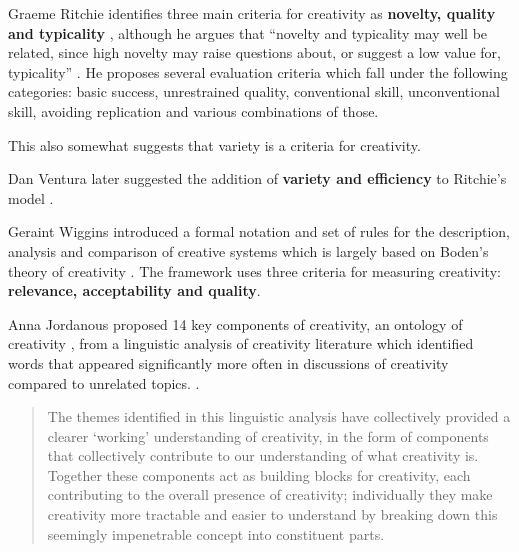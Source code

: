Graeme Ritchie identifies three main criteria for creativity as \textbf{novelty, quality and typicality} \citeyear[p.72-73]{Ritchie2007}, although he argues that ``novelty and typicality may well be related, since high novelty may raise questions about, or suggest a low value for, typicality'' \citeyear[p.73]{Ritchie2007} \citeyear[see also][]{Ritchie2001}. He proposes several evaluation criteria which fall under the following categories: \parencite[p.91-92]{Ritchie2007} basic success, unrestrained quality, conventional skill, unconventional skill, avoiding replication and various combinations of those.

\begin{fcom}
  This also somewhat suggests that variety is a criteria for creativity.
\end{fcom}

Dan Ventura later suggested the addition of \textbf{variety and efficiency} to Ritchie’s model \citeyear[p.7]{Ventura2008}.

Geraint Wiggins introduced a formal notation and set of rules for the description, analysis and comparison of creative systems \citeyear{Wiggins2006} which is largely  based on Boden’s theory of creativity \citeyear{Boden2003}. The framework uses three criteria for measuring creativity: \textbf{relevance, acceptability and quality}.

Anna Jordanous proposed 14 key components of creativity, an ontology of creativity \citeyear[p.104-120]{Jordanous2012}, from a linguistic analysis of creativity literature which identified words that appeared significantly more often in discussions of creativity compared to unrelated topics. \citeyear[p.120]{Jordanous2012}.

\begin{quote}
  The themes identified in this linguistic analysis have collectively provided a clearer ‘working’ understanding of creativity, in the form of components that collectively contribute to our understanding of what creativity is. Together these components act as building blocks for creativity, each contributing to the overall presence of creativity; individually they make creativity more tractable and easier to understand by breaking down this seemingly impenetrable concept into constituent parts. \parencite[p.120]{Jordanous2012}
\end{quote}

